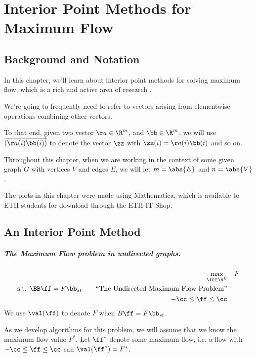 \chapter{Interior Point Methods for Maximum Flow}

\newcommand{\sdiv}{\tilde{D}}
\newcommand\cvec[1]{\overrightarrow{\left(#1\right)}}

\section*{Background and Notation}

In this chapter, we'll learn about interior point methods for solving
maximum flow, which is a rich and active area of research \cite{DS08,M13,LS20a,LS20b}. 

We're going to frequently need to refer to vectors
arising from elementwise operations combining other vectors.

To that end, given two vector $\aa \in \R^m$, and $\bb \in \R^m$, we
will use $\cvec{\aa(i) \bb(i)}$ to denote the vector $\zz$ with
$\zz(i) = \aa(i) \bb(i)$ and so on.

Throughout this chapter, when we are working in the context of some
given graph $G$ with vertices $V$ and edges $E$, we will let $m =
\abs{E}$ and $n = \abs{V}$.

The plots in this chapter were made using Mathematica, which is
available to ETH students for download through the ETH IT Shop.


\section{An Interior Point Method}
\paragraph{The Maximum Flow problem in undirected graphs.}
 \begin{align}
   \label{eq:maxflow}
\max_{\ff \in \R^E}  & \quad F    \\
   \textrm{s.t. }  \BB\ff= F \bb_{st}
     \tag*{``The Undirected Maximum Flow Problem''}
   \\
   \nonumber 
   -\cc \leq \ff \leq \cc
\end{align}
We use $\val(\ff)$ to denote $F$ when $B\ff = F\bb_{st}$.

As we develop algorithms for this problem, we will assume that we know
the maximum flow value $F^*$.
Let $\ff^*$ denote some maximum flow, i.e. a flow with $-\cc \leq \ff
\leq \cc$ can $\val(\ff^*) = F^*$.

